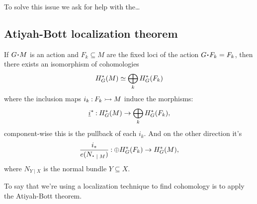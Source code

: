 \documentclass[12pt]{memoir}
\begin{document}
To solve this issue we ask for help with the\dots

\subsection{Atiyah-Bott localization theorem}

\begin{Th}
    If $G\.M$ is an action and $F_k\subseteq M$ are the fixed loci of the action $G\.F_k=F_k$, then there exists an isomorphism of cohomologies
    $$H^\ast_G(M)\simeq \bigoplus_kH^\ast_G(F_k)$$
    where the inclusion maps $i_k\mathbin{:} F_k\rightarrowtail M$ induce the morphisms:
    $$\underline{i}^\ast\mathbin{:}H^\ast_G(M)\to\bigoplus_kH^\ast_G(F_k),$$
    component-wise this is the pullback of each $i_k$. And on the other direction it's
 $$\frac{i_\ast}{e(N_{\.\mid M})}\:\oplus H^\ast_G(F_k)\to H^\ast_G(M),$$ 
 where $N_{Y\mid X}$ is the normal bundle $Y\subseteq X$.
\end{Th}

To say that we're using a localization technique to find cohomology is to apply the Atiyah-Bott theorem.
\end{document}
